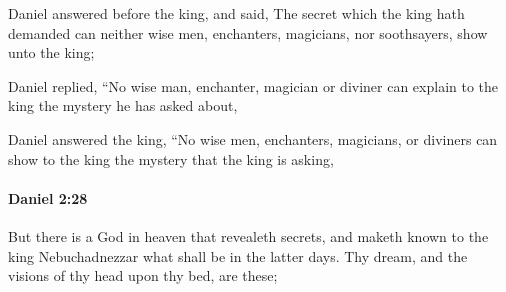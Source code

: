 			\begin{versebox}
					\item[BHS] 
					\item[LXX] 
					\item[ASV] Daniel answered before the king, and said, The secret which the king hath demanded can neither wise men, enchanters, magicians, nor soothsayers, show unto the king;
					\item[NIV] Daniel replied, “No wise man, enchanter, magician or diviner can explain to the king the mystery he has asked about,
					\item[NRSV] Daniel answered the king, “No wise men, enchanters, magicians, or diviners can show to the king the mystery that the king is asking,
			\end{versebox}

		\paragraph{Daniel 2:28} %
			\label{DANIEL-2-28}

			But there is a God in heaven that revealeth secrets, and maketh known to the king Nebuchadnezzar what shall be in the latter days. Thy dream, and the visions of thy head upon thy bed, are these;

